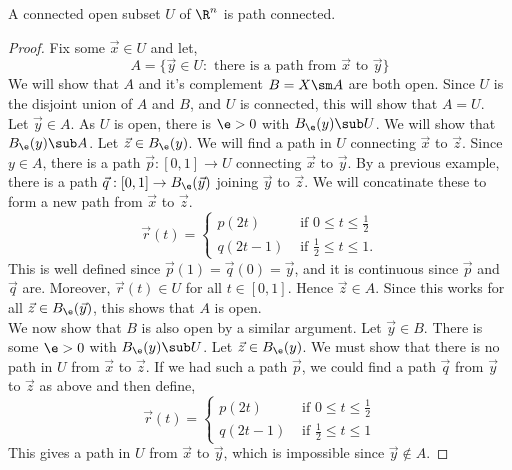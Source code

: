 \begin{nlemma}
  A connected open subset $U$ of $\R^n$ is path connected.
\end{nlemma}
\begin{proof}
  Fix some $\vec x \in U$ and let,
  $$ A = \{\vec y \in U : \text{ there is a path from } \vec x \text{ to } \vec y\} $$
  We will show that $A$ and it's complement $B = X \sm A$ are both open. Since $U$ is the disjoint union of $A$ and $B$, and $U$ is connected, this will show that $A = U$.\\

  \noindent
  Let $\vec y \in A$. As $U$ is open, there is $\e > 0$ with $B_\e (y) \sub U$. We will show that $B_\e(y) \sub A$. Let $\vec z \in B_\e(y)$. We will find a path in $U$ connecting $\vec x$ to $\vec z$. Since $y \in A$, there is a path $\vec p : [0, 1] \to U$ connecting $\vec x$ to $\vec y$.
  By a previous example, there is a path $\vec q : [0, 1] \to B_\e(\vec y)$ joining $\vec y$ to $\vec z$. We will concatinate these to form a new path from $\vec x$ to $\vec z$.
  $$ \vec r(t) = \begin{cases}
    p(2t) & \text{ if } 0 \le t \le \frac{1}{2}\\
    q(2t - 1) & \text{ if } \frac{1}{2}\le t \le 1.
  \end{cases} $$
  This is well defined since $\vec p(1) = \vec q(0) = \vec y$, and it is continuous since $\vec p$ and $\vec q$ are. Moreover, $\vec r(t) \in U$ for all $t \in [0, 1]$. Hence $\vec z \in A$. Since this works for all $\vec z \in B_\e (\vec y)$, this shows that $A$ is open.\\

  \noindent
  We now show that $B$ is also open by a similar argument. Let $\vec y \in B$. There is some $\e> 0$ with $B_\e(y) \sub U$. Let $\vec z \in B_\e(y)$. We must show that there is no path in $U$ from $\vec x$ to $\vec z$. If we had such a path $\vec p$, we could find a path $\vec q$ from $\vec y$ to $\vec z$ as above and then define,
  $$ \vec r(t) = \begin{cases}
    p(2t) & \text{ if } 0 \le t \le \frac{1}{2}\\
    q(2t - 1) & \text{ if }\frac{1}{2}\le t \le 1
  \end{cases} $$
  This gives a path in $U$ from $\vec x$ to $\vec y$, which is impossible since $\vec y \notin A$.
 \end{proof}

